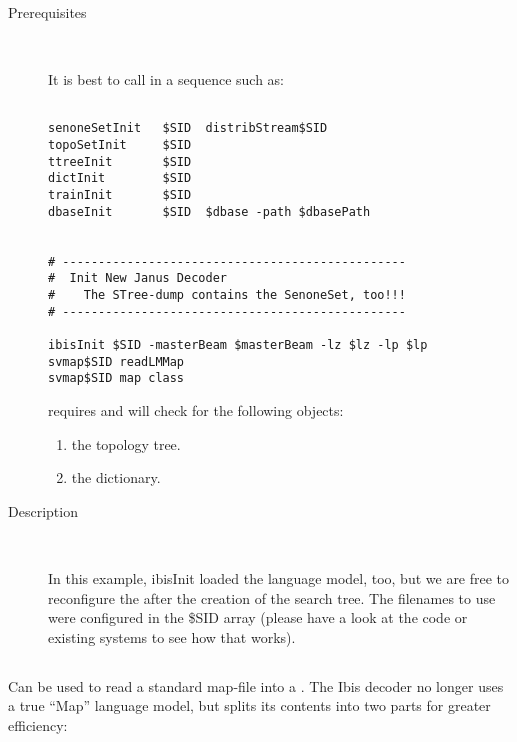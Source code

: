 \begin{description}
\begin{description}
\end{description}

\item[Prerequisites] \

It is best to call  in a sequence such as:

\begin{verbatim}

senoneSetInit   $SID  distribStream$SID
topoSetInit     $SID
ttreeInit       $SID 
dictInit        $SID
trainInit       $SID
dbaseInit       $SID  $dbase -path $dbasePath


# ------------------------------------------------
#  Init New Janus Decoder
#    The STree-dump contains the SenoneSet, too!!!
# ------------------------------------------------

ibisInit $SID -masterBeam $masterBeam -lz $lz -lp $lp
svmap$SID readLMMap
svmap$SID map class

\end{verbatim}


 requires and will check for the following objects:

\begin{enumerate}

\item{} the topology tree.
\item{} the dictionary.

\end{enumerate}

\item[Description] \

In this example, ibisInit  loaded the language  model, too, but we are
free to reconfigure the  after the creation of the
search tree. The filenames  to use were  configured in the \$SID array
(please have a  look at the code or  existing systems to  see how that
works).

\end{description}

\subsection{}

Can be used to read a standard map-file into a .
The Ibis decoder no longer uses a true ``Map'' language model, but
splits its contents into two parts for greater efficiency:

